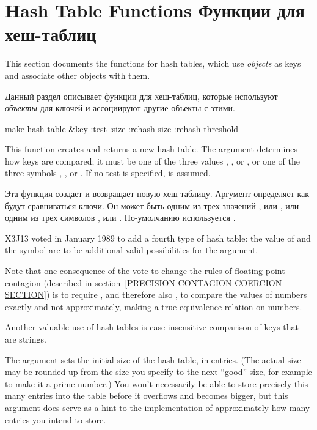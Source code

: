 \section{Hash Table Functions Функции для хеш-таблиц}

This section documents the functions for hash tables, which
use \emph{objects} as keys and associate other objects with them.

Данный раздел описывает функции для хеш-таблиц, которые используют
\emph{объекты} для ключей и ассоциируют другие объекты с этими.

\begin{defun}[Function]
make-hash-table &key :test :size :rehash-size :rehash-threshold

This function creates and returns a new hash table.
The  argument determines how keys are compared;
it must be one of the three values , , or ,
or one of the three symbols , , or .
If no test is specified,  is assumed.

Эта функция создает и возвращает новую хеш-таблицу.
Аргумент  определяет как будут сравниваться ключи.
Он может быть одним из трех значений ,  или ,
или одним из трех символов ,  или .
По-умолчанию используется .

\begin{new}
X3J13 voted in January 1989
to add a fourth type of hash table:
the value of  and the symbol  are to be additional
valid possibilities for the  argument.


Note that one consequence of
the vote to change the rules of
floating-point contagion
(described in section~\ref{PRECISION-CONTAGION-COERCION-SECTION})
is to require \cdf{=}, and therefore also ,
to compare the values of numbers exactly and not approximately, making
 a true equivalence relation on numbers.

Another valuable use of  hash tables is case-insensitive
comparison of keys that are strings.
\end{new}

The  argument
sets the initial size of the hash table, in entries.
(The actual size may be rounded up from the size
you specify to the next ``good'' size, for example to make it a prime number.)
You won't necessarily be able to store precisely
this many entries into the table
before it overflows and becomes bigger, but this argument does serve
as a hint to the implementation of approximately
how many entries you intend to store.


\end{defun}
